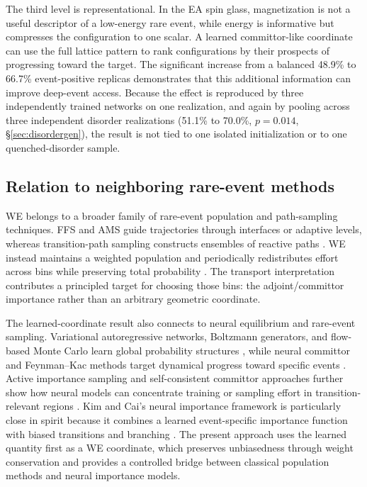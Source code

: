 \documentclass[a4paper,fleqn]{cas-sc}
\begin{document}
The third level is representational. In the EA spin glass, magnetization is not a useful descriptor of a low-energy rare event, while energy is informative but compresses the configuration to one scalar. A learned committor-like coordinate can use the full lattice pattern to rank configurations by their prospects of progressing toward the target. The significant increase from a balanced 48.9\% to 66.7\% event-positive replicas demonstrates that this additional information can improve deep-event access. Because the effect is reproduced by three independently trained networks on one realization, and again by pooling across three independent disorder realizations (51.1\% to 70.0\%, $p=0.014$, \S\ref{sec:disordergen}), the result is not tied to one isolated initialization or to one quenched-disorder sample.

\subsection{Relation to neighboring rare-event methods}\label{sec:priorart}
WE belongs to a broader family of rare-event population and path-sampling techniques. FFS and AMS guide trajectories through interfaces or adaptive levels, whereas transition-path sampling constructs ensembles of reactive paths \citep{allen2009,cerou2007,valeriani2007,dellago1998,bolhuis2002}. WE instead maintains a weighted population and periodically redistributes effort across bins while preserving total probability \citep{huber1996,zhang2010exact,bhatt2010,zuckerman2017}. The transport interpretation contributes a principled target for choosing those bins: the adjoint/committor importance rather than an arbitrary geometric coordinate.

The learned-coordinate result also connects to neural equilibrium and rare-event sampling. Variational autoregressive networks, Boltzmann generators, and flow-based Monte Carlo learn global probability structures \citep{wu2019,noe2019,nicoli2020,gabrie2022}, while neural committor and Feynman--Kac methods target dynamical progress toward specific events \citep{khoo2019,li2022,strahan2023}. Active importance sampling and self-consistent committor approaches further show how neural models can concentrate training or sampling effort in transition-relevant regions \citep{rotskoff2022,kang2024,trizio2025}. Kim and Cai's neural importance framework is particularly close in spirit because it combines a learned event-specific importance function with biased transitions and branching \citep{kimcai2026}. The present approach uses the learned quantity first as a WE coordinate, which preserves unbiasedness through weight conservation and provides a controlled bridge between classical population methods and neural importance models.
\end{document}
